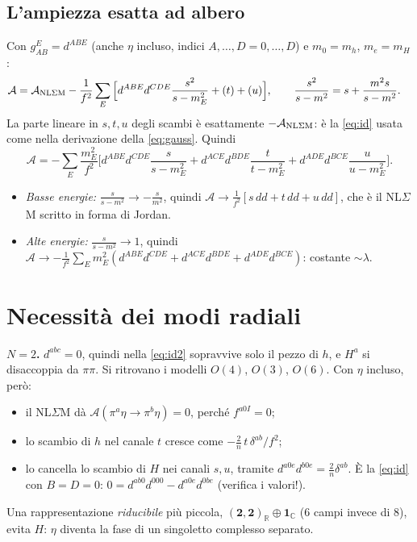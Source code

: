 \documentclass[11pt,a4paper]{article}
\numberwithin{equation}{section}
\theoremstyle{remark}
\newcommand{\R}{\mathbb{R}}
\newcommand{\C}{\mathbb{C}}
\begin{document}
\subsection{L'ampiezza esatta ad albero}

Con $g^E_{AB}=d^{ABE}$ (anche $\eta$ incluso, indici $A,\dots,D=0,\dots,D$) e $m_0=m_h$, $m_e=m_H$:
\begin{align*}
\mathcal A&=\mathcal A_{\rm NL\Sigma M}-\frac1{f^2}\sum_E\Big[d^{ABE}d^{CDE}\frac{s^2}{s-m_E^2}+(t)+(u)\Big],\qquad \frac{s^2}{s-m^2}=s+\frac{m^2s}{s-m^2}.
\end{align*}
La parte lineare in $s,t,u$ degli scambi è esattamente $-\mathcal A_{\rm NL\Sigma M}$: è la \eqref{eq:id} usata come nella derivazione della \eqref{eq:gauss}. Quindi
\begin{equation}
\boxed{\;\mathcal A=-\sum_E\frac{m_E^2}{f^2}\Big[d^{ABE}d^{CDE}\frac{s}{s-m_E^2}+d^{ACE}d^{BDE}\frac{t}{t-m_E^2}+d^{ADE}d^{BCE}\frac{u}{u-m_E^2}\Big].\;}
\end{equation}
\begin{itemize}
\item \emph{Basse energie:} $\frac{s}{s-m^2}\to-\frac{s}{m^2}$, quindi $\mathcal A\to\frac1{f^2}[s\,dd+t\,dd+u\,dd]$, che è il NL$\Sigma$M scritto in forma di Jordan.
\item \emph{Alte energie:} $\frac{s}{s-m^2}\to1$, quindi $\mathcal A\to-\frac{1}{f^2}\sum_Em_E^2(d^{ABE}d^{CDE}+d^{ACE}d^{BDE}+d^{ADE}d^{BCE})$: costante $\sim\lambda$.
\end{itemize}

\section{Necessità dei modi radiali}
\label{sec:necessity}

\textbf{$N=2$.} $d^{abc}=0$, quindi nella \eqref{eq:id2} sopravvive solo il pezzo di $h$, e $H^a$ si disaccoppia da $\pi\pi$. Si ritrovano i modelli $O(4)$, $O(3)$, $O(6)$. Con $\eta$ incluso, però:
\begin{itemize}[nosep]
\item il NL$\Sigma$M dà $\mathcal A(\pi^a\eta\to\pi^b\eta)=0$, perché $f^{a0I}=0$;
\item lo scambio di $h$ nel canale $t$ cresce come $-\frac2n\,t\,\delta^{ab}/f^2$;
\item lo cancella lo scambio di $H$ nei canali $s,u$, tramite $d^{a0e}d^{b0e}=\frac2n\delta^{ab}$. È la \eqref{eq:id} con $B=D=0$: $0=d^{ab0}d^{000}-d^{a0e}d^{0be}$ (verifica i valori!).
\end{itemize}
Una rappresentazione \emph{riducibile} più piccola, $(\mathbf2,\mathbf2)_\R\oplus\mathbf1_\C$ (6 campi invece di 8), evita $H$: $\eta$ diventa la fase di un singoletto complesso separato.
\end{document}
